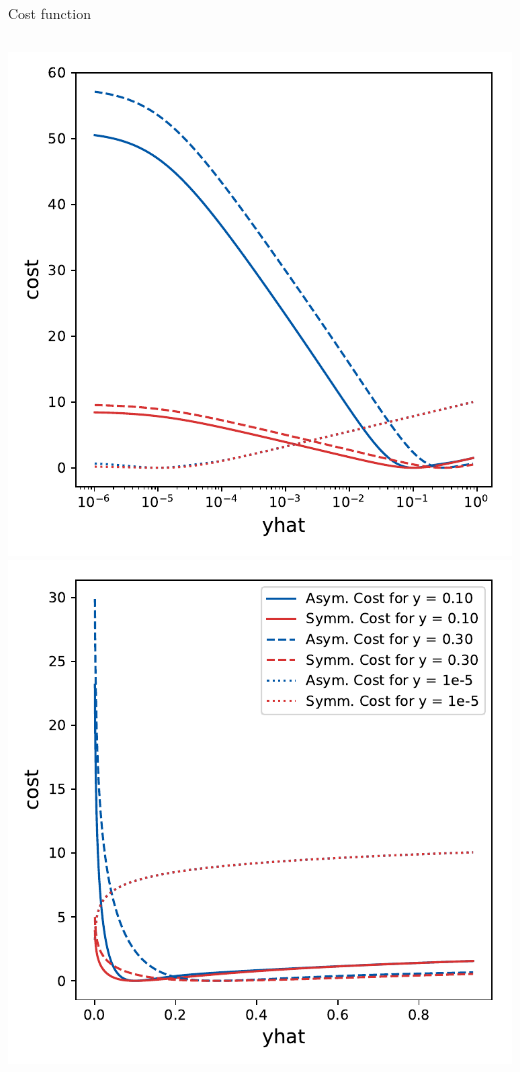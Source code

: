 \begin{frame}{Cost function}
    \begin{columns}
      \centering
      \includegraphics[width=\textwidth, trim=20 0 20 0]{images/Asym_CostPlot_190302.pdf}
      \centering
      \includegraphics[width=\textwidth, trim=20 0 20 0]{images/Asym_CostPlot_190302_linear.pdf}

\end{columns}
\end{frame}
